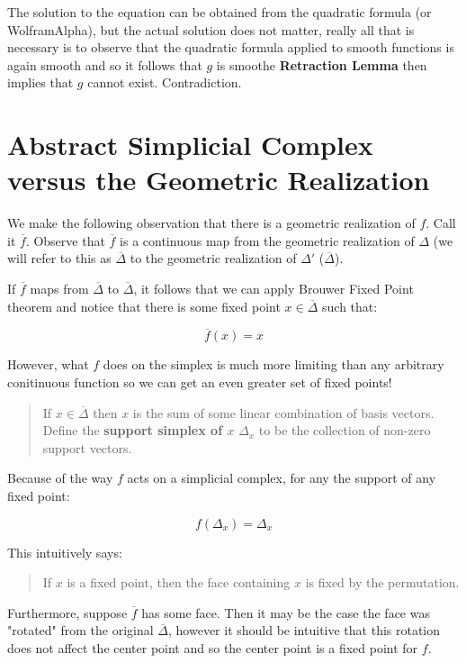 \documentclass[letterpaper,12pt]{article}
\newcommand{\ol}{\overline}
\begin{document}
The solution to the equation can be obtained from the quadratic formula (or WolframAlpha), but the actual solution does not matter, really all that is necessary is to observe that the quadratic formula applied to smooth functions is again smooth and so it follows that $g$ is smoothe \textbf{Retraction Lemma} then implies that $g$ cannot exist. Contradiction.

\section{Abstract Simplicial Complex versus the Geometric Realization}

We make the following observation that there is a geometric realization of $f$. Call it $\ol{f}$. Observe that $\ol{f}$ is a continuous map from the geometric realization of $\Delta$ (we will refer to this as $\ol{\Delta}$ to the geometric realization of $\Delta'$ ($\ol{\Delta}$).

If $\ol{f}$ maps from $\ol{\Delta}$ to $\ol{\Delta}$, it follows that we can apply Brouwer Fixed Point theorem and notice that there is some fixed point $x \in \ol{\Delta}$ such that:

$$\ol{f}(x) = x$$

However, what $f$ does on the simplex is much more limiting than any arbitrary conitinuous function so we can get an even greater set of fixed points!

\begin{quote}
    If $x \in \ol{\Delta}$ then $x$ is the sum of some linear combination of basis vectors. Define the \textbf{support simplex of $x$} $\Delta_x$ to be the collection of non-zero support vectors.
\end{quote}

Because of the way $f$ acts on a simplicial complex, for any the support of any fixed point:

$$f(\Delta_{x}) = \Delta_x$$

This intuitively says:

\begin{quote}
    If $x$ is a fixed point, then the face containing $x$ is fixed by the permutation.
\end{quote}

Furthermore, suppose $\ol{f}$ has some face. Then it may be the case the face was "rotated" from the original $\ol{\Delta}$, however it should be intuitive that this rotation does not affect the center point and so the center point is a fixed point for $f$.
\end{document}
